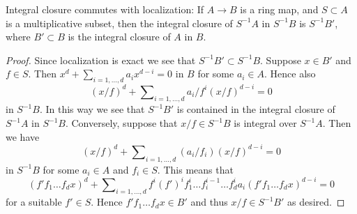 \begin{lemma}
\label{lemma-integral-closure-localize}
Integral closure commutes with localization: If $A \to B$ is a ring
map, and $S \subset A$ is a multiplicative subset, then the integral
closure of $S^{-1}A$ in $S^{-1}B$ is $S^{-1}B'$, where $B' \subset B$
is the integral closure of $A$ in $B$.
\end{lemma}

\begin{proof}
Since localization is exact we see that $S^{-1}B' \subset S^{-1}B$.
Suppose $x \in B'$ and $f \in S$. Then
$x^d + \sum_{i = 1, \ldots, d} a_i x^{d - i} = 0$
in $B$ for some $a_i \in A$. Hence also
$$
(x/f)^d + \sum\nolimits_{i = 1, \ldots, d} a_i/f^i (x/f)^{d - i} = 0
$$
in $S^{-1}B$. In this way we see that $S^{-1}B'$ is contained in
the integral closure of $S^{-1}A$ in $S^{-1}B$. Conversely, suppose
that $x/f \in S^{-1}B$ is integral over $S^{-1}A$. Then we have
$$
(x/f)^d + \sum\nolimits_{i = 1, \ldots, d} (a_i/f_i) (x/f)^{d - i} = 0
$$
in $S^{-1}B$ for some $a_i \in A$ and $f_i \in S$. This means that
$$
(f'f_1 \ldots f_d x)^d +
\sum\nolimits_{i = 1, \ldots, d}
f^i(f')^if_1^i \ldots f_i^{i - 1} \ldots f_d^i a_i
(f'f_1 \ldots f_dx)^{d - i} = 0
$$
for a suitable $f' \in S$. Hence $f'f_1\ldots f_dx \in B'$ and thus
$x/f \in S^{-1}B'$ as desired.
\end{proof}
